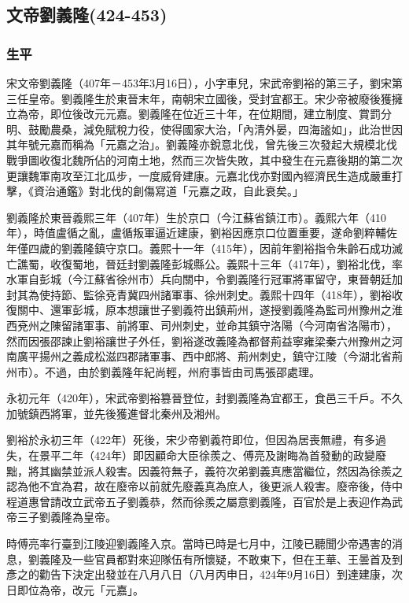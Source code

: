 
\subsection{文帝劉義隆\tiny(424-453)}

\subsubsection{生平}

宋文帝劉義隆（407年－453年3月16日），小字車兒，宋武帝劉裕的第三子，劉宋第三任皇帝。劉義隆生於東晉末年，南朝宋立國後，受封宜都王。宋少帝被廢後獲擁立為帝，即位後改元元嘉。劉義隆在位近三十年，在位期間，建立制度、賞罰分明、鼓勵農桑，減免賦稅力役，使得國家大治，「內清外晏，四海謐如」，此治世因其年號元嘉而稱為「元嘉之治」。劉義隆亦銳意北伐，曾先後三次發起大規模北伐戰爭圖收復北魏所佔的河南土地，然而三次皆失敗，其中發生在元嘉後期的第二次更讓魏軍南攻至江北瓜步，一度威脅建康。元嘉北伐亦對國內經濟民生造成嚴重打擊，《資治通鑑》對北伐的創傷寫道「元嘉之政，自此衰矣。」

劉義隆於東晉義熙三年（407年）生於京口（今江蘇省鎮江市）。義熙六年（410年），時值盧循之亂，盧循叛軍逼近建康，劉裕因應京口位置重要，遂命劉粹輔佐年僅四歲的劉義隆鎮守京口。義熙十一年（415年），因前年劉裕指令朱齡石成功滅亡譙蜀，收復蜀地，晉廷封劉義隆彭城縣公。義熙十三年（417年），劉裕北伐，率水軍自彭城（今江蘇省徐州市）兵向關中，令劉義隆行冠軍將軍留守，東晉朝廷加封其為使持節、監徐兗青冀四州諸軍事、徐州刺史。義熙十四年（418年），劉裕收復關中、還軍彭城，原本想讓世子劉義符出鎮荊州，遂授劉義隆為監司州豫州之淮西兗州之陳留諸軍事、前將軍、司州刺史，並命其鎮守洛陽（今河南省洛陽市），然而因張邵諫止劉裕讓世子外任，劉裕遂改義隆為都督荊益寧雍梁秦六州豫州之河南廣平揚州之義成松滋四郡諸軍事、西中郎將、荊州刺史，鎮守江陵（今湖北省荊州市）。不過，由於劉義隆年紀尚輕，州府事皆由司馬張邵處理。

永初元年（420年），宋武帝劉裕篡晉登位，封劉義隆為宜都王，食邑三千戶。不久加號鎮西將軍，並先後獲進督北秦州及湘州。

劉裕於永初三年（422年）死後，宋少帝劉義符即位，但因為居喪無禮，有多過失，在景平二年（424年）即因顧命大臣徐羨之、傅亮及謝晦為首發動的政變廢黜，將其幽禁並派人殺害。因義符無子，義符次弟劉義真應當繼位，然因為徐羨之認為他不宜為君，故在廢帝以前就先廢義真為庶人，後更派人殺害。廢帝後，侍中程道惠曾請改立武帝五子劉義恭，然而徐羨之屬意劉義隆，百官於是上表迎作為武帝三子劉義隆為皇帝。

時傅亮率行臺到江陵迎劉義隆入京。當時已時是七月中，江陵已聽聞少帝遇害的消息，劉義隆及一些官員都對來迎隊伍有所懷疑，不敢東下，但在王華、王曇首及到彥之的勸告下決定出發並在八月八日（八月丙申日，424年9月16日）到達建康，次日即位為帝，改元「元嘉」。

